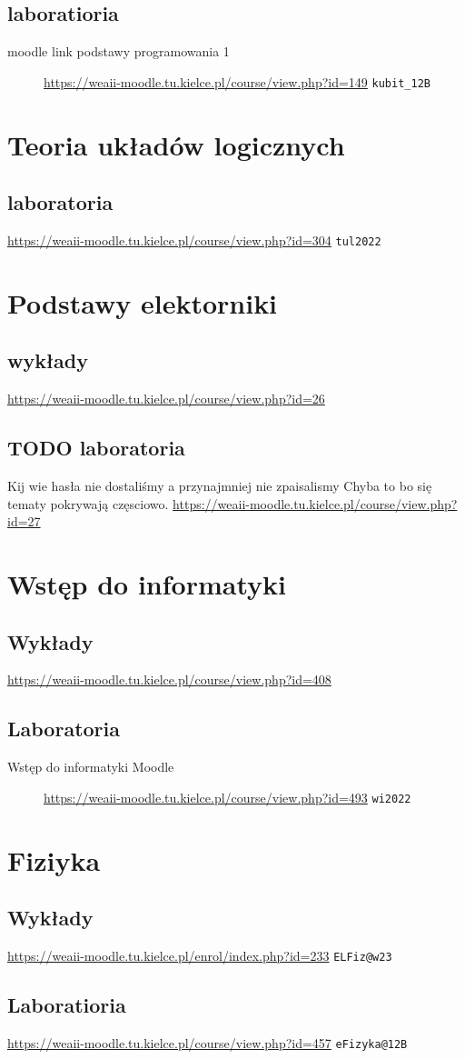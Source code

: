 \documentclass[11pt]{article}
\begin{document}
\subsection{laboratioria}
\label{sec:org0ac6b71}
\begin{description}
\item[{moodle link podstawy programowania 1}] \url{https://weaii-moodle.tu.kielce.pl/course/view.php?id=149} \texttt{kubit\_12B}
\end{description}
\section{Teoria układów logicznych}
\label{sec:orgf823110}
\subsection{laboratoria}
\label{sec:org4a9434e}
\url{https://weaii-moodle.tu.kielce.pl/course/view.php?id=304} \texttt{tul2022}
\section{Podstawy elektorniki}
\label{sec:org0eac872}
\subsection{wykłady}
\label{sec:org47ea1d1}
\url{https://weaii-moodle.tu.kielce.pl/course/view.php?id=26}
\subsection{{\bfseries\sffamily TODO} laboratoria}
\label{sec:org6ad1013}
Kij wie hasła nie dostaliśmy a przynajmniej nie zpaisalismy
Chyba to bo się tematy pokrywają częsciowo.
\url{https://weaii-moodle.tu.kielce.pl/course/view.php?id=27}
\section{Wstęp do informatyki}
\label{sec:orgcc00c31}
\subsection{Wykłady}
\label{sec:org8c0a5b9}
\url{https://weaii-moodle.tu.kielce.pl/course/view.php?id=408}
\subsection{Laboratoria}
\label{sec:orgadf2c23}
\begin{description}
\item[{Wstęp do informatyki Moodle}] \url{https://weaii-moodle.tu.kielce.pl/course/view.php?id=493} \texttt{wi2022}
\end{description}
\section{Fiziyka}
\label{sec:orgdc08dbc}
\subsection{Wykłady}
\label{sec:orgb6b325d}
\url{https://weaii-moodle.tu.kielce.pl/enrol/index.php?id=233} \texttt{ELFiz@w23}
\subsection{Laboratioria}
\label{sec:org27bcbde}
\url{https://weaii-moodle.tu.kielce.pl/course/view.php?id=457} \texttt{eFizyka@12B}
\end{document}
